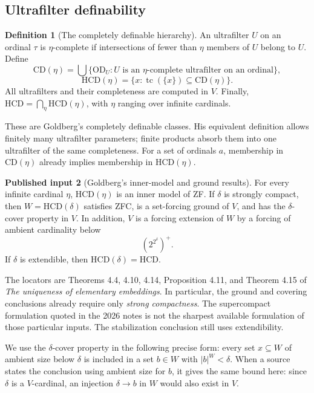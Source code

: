 \documentclass[11pt,letterpaper]{article}
\theoremstyle{definition}
\newtheorem{definition}{Definition}[section]
\newcommand{\OD}{\mathrm{OD}}
\newcommand{\HCD}{\mathrm{HCD}}
\newcommand{\CD}{\mathrm{CD}}
\newcommand{\tc}{\operatorname{tc}}
\newtheorem{inputtheorem}[definition]{Published input}
\theoremstyle{remark}
\begin{document}
\subsection{Ultrafilter definability}

\begin{definition}[The completely definable hierarchy]\label{def:hcd}
An ultrafilter $U$ on an ordinal $\tau$ is $\eta$-complete if intersections of fewer than $\eta$ members of $U$ belong to $U$. Define
\[
 \CD(\eta)=\bigcup\{\OD_U:U\text{ is an }\eta\text{-complete ultrafilter on an ordinal}\},
\]
\[
 \HCD(\eta)=\{x:\tc(\{x\})\subseteq\CD(\eta)\}.
\]
All ultrafilters and their completeness are computed in $V$. Finally,
$\HCD=\bigcap_\eta\HCD(\eta)$, with $\eta$ ranging over infinite cardinals.
\end{definition}

These are Goldberg's completely definable classes. His equivalent definition allows finitely many ultrafilter parameters; finite products absorb them into one ultrafilter of the same completeness. For a set of ordinals $a$, membership in $\CD(\eta)$ already implies membership in $\HCD(\eta)$.\cite[Propositions 4.2--4.3]{unique}

\begin{inputtheorem}[Goldberg's inner-model and ground results]\label{input:hcd}
For every infinite cardinal $\eta$, $\HCD(\eta)$ is an inner model of ZF. If $\delta$ is strongly compact, then $W=\HCD(\delta)$ satisfies ZFC, is a set-forcing ground of $V$, and has the $\delta$-cover property in $V$. In addition, $V$ is a forcing extension of $W$ by a forcing of ambient cardinality below
\[
 (2^{2^\delta})^+.
\]
If $\delta$ is extendible, then $\HCD(\delta)=\HCD$.
\end{inputtheorem}

The locators are Theorems 4.4, 4.10, 4.14, Proposition 4.11, and Theorem 4.15 of \emph{The uniqueness of elementary embeddings}. In particular, the ground and covering conclusions already require only \emph{strong compactness}. The supercompact formulation quoted in the 2026 notes is not the sharpest available formulation of those particular inputs. The stabilization conclusion still uses extendibility.\cite{unique}

We use the $\delta$-cover property in the following precise form: every set $x\subseteq W$ of ambient size below $\delta$ is included in a set $b\in W$ with $|b|^W<\delta$. When a source states the conclusion using ambient size for $b$, it gives the same bound here: since $\delta$ is a $V$-cardinal, an injection $\delta\to b$ in $W$ would also exist in $V$.
\end{document}

